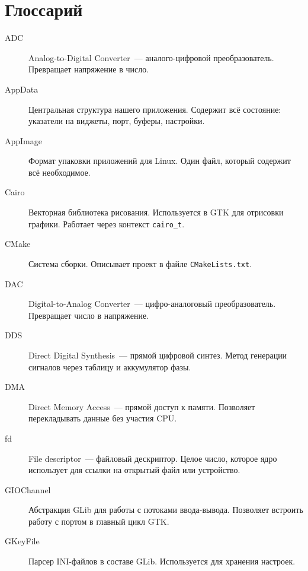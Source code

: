 
\chapter{Глоссарий}
\label{app:glossary}

\begin{description}

\item[ADC] Analog-to-Digital Converter~--- аналого-цифровой
    преобразователь. Превращает напряжение в число.

\item[AppData] Центральная структура нашего приложения. Содержит
    всё состояние: указатели на виджеты, порт, буферы, настройки.

\item[AppImage] Формат упаковки приложений для Linux. Один файл,
    который содержит всё необходимое.

\item[Cairo] Векторная библиотека рисования. Используется в GTK
    для отрисовки графики. Работает через контекст \texttt{cairo\_t}.

\item[CMake] Система сборки. Описывает проект в файле
    \texttt{CMakeLists.txt}.

\item[DAC] Digital-to-Analog Converter~--- цифро-аналоговый
    преобразователь. Превращает число в напряжение.

\item[DDS] Direct Digital Synthesis~--- прямой цифровой синтез.
    Метод генерации сигналов через таблицу и аккумулятор фазы.

\item[DMA] Direct Memory Access~--- прямой доступ к памяти.
    Позволяет перекладывать данные без участия CPU.

\item[fd] File descriptor~--- файловый дескриптор. Целое число,
    которое ядро использует для ссылки на открытый файл или
    устройство.

\item[GIOChannel] Абстракция GLib для работы с потоками ввода-вывода.
    Позволяет встроить работу с портом в главный цикл GTK.

\item[GKeyFile] Парсер INI-файлов в составе GLib. Используется
    для хранения настроек.


\end{description}
